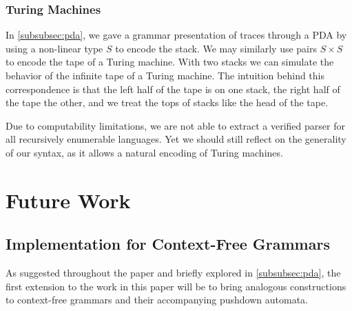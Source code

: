 \documentclass[acmsmall,screen,nonacm]{acmart}
\newcommand{\String}{\Sigma^{*}}
\newcommand{\LinPiTy}[3]{\widebar\Pi #1 : #2.\, #3}
\begin{document}


\subsubsection{Turing Machines}
\label{subsubsec:tm}

In
\cref{subsubsec:pda}, we gave a grammar presentation of
traces through a PDA by using a non-linear type $S$
to encode the stack. We may similarly use pairs $S \times S$
to encode the tape of a Turing machine. With two stacks we can simulate the behavior of the
infinite tape of a Turing machine. The intuition behind this correspondence is
that the left half of the tape is on one stack, the right
half of the tape the other, and we treat the tops of stacks
like the head of the tape.

Due to computability limitations, we are not able to extract
a verified parser for all recursively enumerable languages.
Yet we should still reflect on the generality of our syntax,
as it allows a natural encoding of Turing machines.

\section{Future Work}
\label{sec:future}

\subsection{Implementation for Context-Free Grammars}
As suggested throughout the paper and briefly explored in
\cref{subsubsec:pda}, the first extension to the work in
this paper will be to bring analogous constructions to
context-free grammars and their accompanying pushdown automata.
\end{document}
